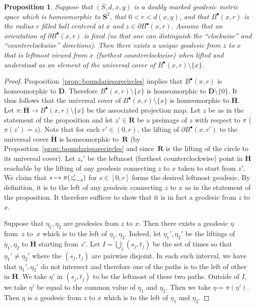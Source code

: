 \documentclass[JEP,XML,SOM,Unicode]{cedram}
\newcommand\mto{\mathchoice{\longmapsto}{\mapsto}{\mapsto}{\mapsto}}
\newcommand{\sbullet}{{\scriptscriptstyle\bullet}}
\theoremstyle{plain}
\numberwithin{theorem}{section}
\newtheorem{proposition}[theorem]{Proposition}
\theoremstyle{definition}
\newcommand{\R}{\mathbf{R}}
\newcommand{\D}{\mathbf{D}}
\renewcommand{\S}{{\mathbf S}}
\newcommand{\h}{\mathbf{H}}
\let\ol\overline
\newcommand{\fb}[2]{B^\sbullet(#1,#2)}
\begin{document}
\begin{proposition}
\label{prop::uniqueleftmost}
Suppose that $(S, d, x,y)$ is a doubly marked geodesic metric space which is homeomorphic to $\S^2$, that $0 < r < d(x,y)$, and that $\fb{x}{r}$ is the radius $r$ filled ball centered at $x$ and $z \in \partial \fb{x}{r}$. Assume that an orientation of $\partial \fb{x}{r}$ is fixed (so that one can distinguish the ``clockwise'' and ``counterclockwise'' directions). Then there exists a unique geodesic from $z$ to $x$ that is \emph{leftmost} viewed from $x$ (\ie furthest counterclockwise) when lifted and understood as an element of the universal cover of $\fb{x}{r} \setminus \{x\}$.
\end{proposition}
\begin{proof}
Proposition~\ref{prop::boundariesarecircles} implies that $\fb{x}{r}$ is homeomorphic to $\ol{\D}$. Therefore $\fb{x}{r} \setminus \{x\}$ is homeomorphic to $\ol{\D} \setminus \{0\}$. It thus follows that the universal cover of $\fb{x}{r} \setminus \{x\}$ is homeomorphic to $\ol{\h}$. Let $\pi \colon \ol{\h} \to \fb{x}{r} \setminus \{x\}$ be the associated projection map. Let $z$ be as in the statement of the proposition and let $z' \in \R$ be a preimage of $z$ with respect to $\pi$ (\ie $\pi(z') = z$). Note that for each $r' \in (0,r)$, the lifting of $\partial \fb{x}{r'}$ to the universal cover $\ol{\h}$ is homeomorphic to~$\R$ (by Proposition~\ref{prop::boundariesarecircles} and since~$\R$ is the lifting of the circle to its universal cover). Let $z_r'$ be the leftmost (\ie furthest counterclockwise) point in $\ol{\h}$ reachable by the lifting of any geodesic connecting $z$ to $x$ taken to start from $z'$. We claim that $s \mto \pi(z_{r-s}')$ for $s \in [0,r]$ forms the desired leftmost geodesic. By definition, it is to the left of any geodesic connecting $z$ to $x$ as in the statement of the proposition. It therefore suffices to show that it is in fact a geodesic from $z$ to $x$.

Suppose that $\eta_1,\eta_2$ are geodesics from $z$ to $x$. Then there exists a geodesic $\eta$ from~$z$ to~$x$ which is to the left of $\eta_1,\eta_2$. Indeed, let $\eta_1',\eta_2'$ be the liftings of $\eta_1,\eta_2$ to $\ol{\h}$ starting from $z'$. Let $I = \bigcup_j (s_j,t_j)$ be the set of times so that $\eta_1' \neq \eta_2'$ where the $(s_j,t_j)$ are pairwise disjoint. In each such interval, we have that $\eta_1',\eta_2'$ do not intersect and therefore one of the paths is to the left of other in $\ol{\h}$. We take $\eta'$ in $(s_j,t_j)$ to be the leftmost of these two paths. Outside of $I$, we take $\eta'$ be equal to the common value of $\eta_1$ and $\eta_2$. Then we take $\eta = \pi(\eta')$. Then $\eta$ is a geodesic from $z$ to $x$ which is to the left of $\eta_1$ and $\eta_2$.


\end{proof}
\end{document}
